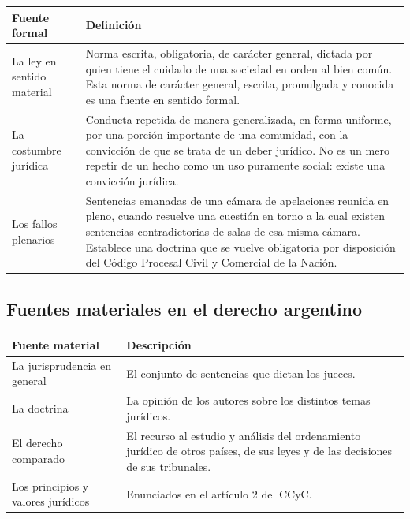 \documentclass[12pt,oneside]{book}
\begin{document}
\begin{table}[H]
\centering
\begin{tabularx}{\textwidth}{>{\raggedright\arraybackslash}p{} >{\raggedright\arraybackslash}X}
\toprule
\textbf{Fuente formal} & \textbf{Definición} \\
\midrule
La ley en sentido material &
Norma escrita, obligatoria, de carácter general, dictada por quien tiene el cuidado de una sociedad en orden al bien común. Esta norma de carácter general, escrita, promulgada y conocida es una fuente en sentido formal. \\
\addlinespace
La costumbre jurídica &
Conducta repetida de manera generalizada, en forma uniforme, por una porción importante de una comunidad, con la convicción de que se trata de un deber jurídico. No es un mero repetir de un hecho como un uso puramente social: existe una convicción jurídica. \\
\addlinespace
Los fallos plenarios &
Sentencias emanadas de una cámara de apelaciones reunida en pleno, cuando resuelve una cuestión en torno a la cual existen sentencias contradictorias de salas de esa misma cámara. Establece una doctrina que se vuelve obligatoria por disposición del Código Procesal Civil y Comercial de la Nación. \\
\bottomrule
\end{tabularx}
\end{table}

\subsection{Fuentes materiales en el derecho argentino}

\begin{table}[H]
\centering
\begin{tabularx}{\textwidth}{>{\raggedright\arraybackslash}p{} >{\raggedright\arraybackslash}X}
\toprule
\textbf{Fuente material} & \textbf{Descripción} \\
\midrule
La jurisprudencia en general & El conjunto de sentencias que dictan los jueces. \\
\addlinespace
La doctrina & La opinión de los autores sobre los distintos temas jurídicos. \\
\addlinespace
El derecho comparado & El recurso al estudio y análisis del ordenamiento jurídico de otros países, de sus leyes y de las decisiones de sus tribunales. \\
\addlinespace
Los principios y valores jurídicos & Enunciados en el artículo 2 del CCyC. \\
\bottomrule
\end{tabularx}
\end{table}
\end{document}
